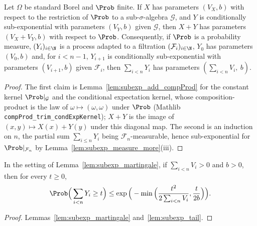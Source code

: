 \begin{lemma}\label{lem:subexp_martingale}
\leanok
{}
Let $\Omega$ be standard Borel and $\Prob$ finite. If $X$ has parameters $(V_X, b)$ with
respect to the restriction of $\Prob$ to a sub-$\sigma$-algebra $\mathcal G$, and $Y$ is
conditionally sub-exponential with parameters $(V_Y, b)$ given $\mathcal G$, then $X + Y$ has
parameters $(V_X + V_Y, b)$ with respect to $\Prob$. Consequently, if $\Prob$ is a probability
measure, $(Y_i)_{i\in\N}$ is a process adapted to a filtration $(\mathcal F_i)_{i\in\N}$,
$Y_0$ has parameters $(V_0, b)$ and, for $i < n-1$, $Y_{i+1}$ is conditionally
sub-exponential with parameters $(V_{i+1}, b)$ given $\mathcal F_i$, then
$\sum_{i<n}Y_i$ has parameters $(\sum_{i<n}V_i,\ b)$.
\end{lemma}

\begin{proof}
\leanok
{}
The first claim is Lemma~\ref{lem:subexp_add_compProd} for the constant kernel
$\Prob|_{\mathcal G}$ and the conditional expectation kernel, whose composition-product is
the law of $\omega\mapsto(\omega,\omega)$ under $\Prob$ (Mathlib
\texttt{compProd\_trim\_condExpKernel}); $X + Y$ is the image of $(x,y)\mapsto X(x)+Y(y)$
under this diagonal map. The second is an induction on $n$, the partial sum
$\sum_{i\le n}Y_i$ being $\mathcal F_n$-measurable, hence sub-exponential for
$\Prob|_{\mathcal F_n}$ by Lemma~\ref{lem:subexp_measure_more}(iii).
\end{proof}

\begin{lemma}\label{lem:azuma_bernstein}
\leanok
{}
In the setting of Lemma~\ref{lem:subexp_martingale}, if $\sum_{i<n}V_i > 0$ and $b > 0$, then
for every $t \ge 0$,
\[
  \Prob\Big(\sum_{i<n}Y_i \ge t\Big)
  \le \exp\Big(-\min\Big(\frac{t^2}{2\sum_{i<n}V_i}, \frac{t}{2b}\Big)\Big).
\]
\end{lemma}

\begin{proof}
\leanok
{}
Lemmas~\ref{lem:subexp_martingale} and~\ref{lem:subexp_tail}.
\end{proof}

